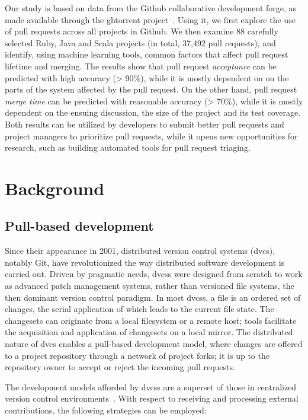 \documentclass{sig-alternate}
\begin{document}
Our study is based on data from the Github collaborative development forge, as
made available through the {\sc ght}orrent project~\cite{GS12}. Using it, we first
explore the use of pull requests across all projects in Github. We then examine
88 carefully selected Ruby, Java and Scala projects (in total, 37,492 pull requests), and
identify, using machine learning tools, common factors that affect pull request
lifetime and merging. The results show that pull request \emph{acceptance}
can be predicted with high accuracy (> 90\%), while it is mostly dependent on
on the parts of the system affected by the pull request. On the other hand, pull
request \emph{merge time} can be predicted with reasonable accuracy (> 70\%),
while it is mostly dependent on the ensuing discussion, the size of the project
and its test coverage. Both results can be utilized by developers to
submit better pull requests and project managers to prioritize pull requests, while
it opens new opportunities for research, such as building automated tools for
pull request triaging.

\section{Background} \label{sec:bg}
\subsection{Pull-based development}

Since their appearance in 2001, distributed
version control systems ({\sc dvcs}), notably Git, have revolutionized the way
distributed software development is carried out. Driven by pragmatic needs, {\sc
dvcs}s were designed from scratch to work as advanced patch management
systems, rather than versioned file systems, the then dominant version control
paradigm. In most {\sc dvcs}s, a file is an ordered set of changes, the serial
application of which leads to the current file state. The changesets can
originate from a local filesystem or a remote host; tools facilitate the
acquisition and application of changesets on a local mirror. The distributed
nature of {\sc dvcs} enables a pull-based development model, where changes are
offered to a project repository through a network of project forks; it is up to
the repository owner to accept or reject the incoming pull requests.

The development models afforded by {\sc dvcs}s are a superset of 
those in centralized version control environments~\cite{Shiha12,Bird09}. 
With respect to receiving and processing external contributions,
the following strategies can be employed:
\end{document}

